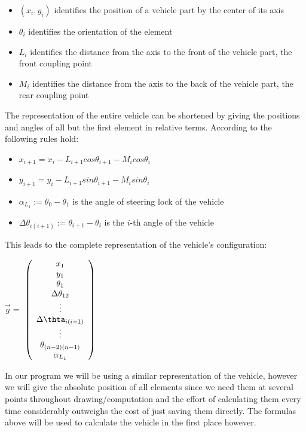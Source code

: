 \begin{itemize}
	\item $(x_i,y_i)$ identifies the position of a vehicle part by the center of its axis
	\item $\theta_i$ identifies the orientation of the element
	\item $L_i$ identifies the distance from the axis to the front of the vehicle part, the front coupling point
	\item $M_i$ identifies the distance from the axis to the back of the vehicle part, the rear coupling point
\end{itemize}

The representation of the entire vehicle can be shortened by giving the positions and angles of all but the first element in relative terms. According to \cite{28} the following rules hold:
\begin{itemize}
	\item $x_{i+1}=x_i-L_{i+1} cos \theta_{i+1}-M_i cos \theta_i$
	\item $y_{i+1}=y_i-L_{i+1} sin \theta_{i+1}-M_i sin \theta_i$
	\item $\alpha_{L_1}:=\theta_0-\theta_1$ is the angle of steering lock of the vehicle
	\item $\Delta \theta_{i(i+1)}:= \theta_{i+1}-\theta_i$ is the $i$-th angle of the vehicle
\end{itemize}

This leads to the complete representation of the vehicle's configuration:
\begin{center}
$\vec{g}=$
$\left(
	\begin{array}{c}
		x_1\\
		y_1\\
		\theta_1\\
		\Delta \theta_{12}\\
		\vdots\\
		\Delta \thta_{i(i+1)}\\
		\vdots\\
		\theta_{(n-2)(n-1)}\\
		\alpha_{L_1} 
	\end{array}
\right)$
\end{center}

In our program we will be using a similar representation of the vehicle, however we will give the absolute position of all elements since we need them at several points throughout drawing/computation and the effort of calculating them every time considerably outweighs the cost of just saving them directly. The formulas above will be used to calculate the vehicle in the first place however.

